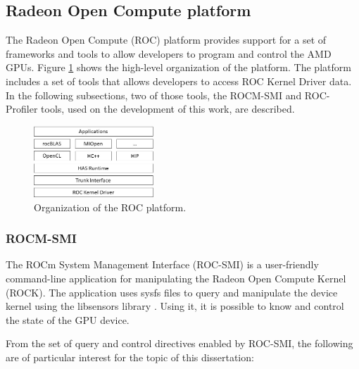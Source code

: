\subsection{Radeon Open Compute platform}

The Radeon Open Compute (ROC) \cite{noauthor_radeonopencompute/rocm_2019} platform provides support for a set of frameworks and tools to allow developers to program and control the AMD GPUs. Figure \ref{fig:rocmplatform} shows the high-level organization of the platform. The platform includes a set of tools that allows developers to access ROC Kernel Driver data. In the following subsections, two of those tools, the ROCM-SMI \cite{noauthor_radeonopencompute/roc-smi_2019} and ROC-Profiler \cite{noauthor_rocm-developer-tools/rocprofiler_2019} tools, used on the development of this work, are described.

\begin{figure}[!htb]
  \centering
  \includegraphics[width=0.4\textwidth]{Figures/StateArt/ROC_stack.jpg}
  \caption{Organization of the ROC platform.}
  \label{fig:rocmplatform}
\end{figure}

\subsubsection{ROCM-SMI}
The ROCm System Management Interface (ROC-SMI) \cite{noauthor_radeonopencompute/roc-smi_2019} is a user-friendly command-line application for manipulating the Radeon Open Compute Kernel (ROCK). The application uses sysfs files to query and manipulate the device kernel using the libsensors library \cite{noauthor_libsensors3:_nodate}. Using it, it is possible to know and control the state of the GPU device.

From the set of query and control directives enabled by ROC-SMI, the following are of particular interest for the topic of this dissertation:


